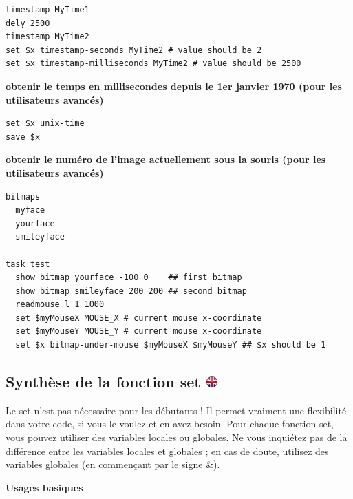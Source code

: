 \documentclass[
]{book}
\begin{document}
\begin{verbatim}
timestamp MyTime1
dely 2500
timestamp MyTime2
set $x timestamp-seconds MyTime2 # value should be 2
set $x timestamp-milliseconds MyTime2 # value should be 2500
\end{verbatim}

\textbf{obtenir le temps en millisecondes depuis le 1er janvier 1970
(pour les utilisateurs avancés)}

\begin{verbatim}
set $x unix-time
save $x
\end{verbatim}

\textbf{obtenir le numéro de l'image actuellement sous la souris (pour
les utilisateurs avancés)}

\begin{verbatim}
bitmaps
  myface
  yourface
  smileyface

task test
  show bitmap yourface -100 0    ## first bitmap
  show bitmap smileyface 200 200 ## second bitmap
  readmouse l 1 1000
  set $myMouseX MOUSE_X # current mouse x-coordinate
  set $myMouseY MOUSE_Y # current mouse x-coordinate
  set $x bitmap-under-mouse $myMouseX $myMouseY ## $x should be 1
\end{verbatim}

\hypertarget{synthuxe8se-de-la-fonction-set}{%
\subsection[Synthèse de la fonction set ]{\texorpdfstring{Synthèse de la
fonction set
\href{https://www.psytoolkit.org/doc3.2.0/syntax.html\#_summary_of_set}{\protect\includegraphics{img/ukflag.png}}}{Synthèse de la fonction set }}\label{synthuxe8se-de-la-fonction-set}}

Le set n'est pas nécessaire pour les débutants ! Il permet vraiment une
flexibilité dans votre code, si vous le voulez et en avez besoin. Pour
chaque fonction set, vous pouvez utiliser des variables locales ou
globales. Ne vous inquiétez pas de la différence entre les variables
locales et globales ; en cas de doute, utilisez des variables globales
(en commençant par le signe \&).

\textbf{Usages basiques}
\end{document}
